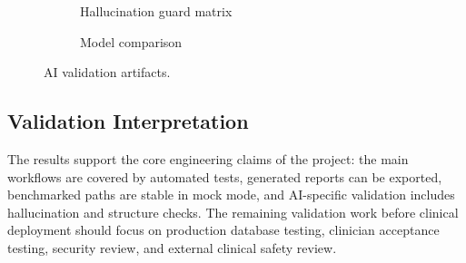 \begin{figure}[h]
\centering
\begin{subfigure}{0.48\textwidth}
  \centering
  \caption{Hallucination guard matrix}
\end{subfigure}\hfill
\begin{subfigure}{0.48\textwidth}
  \centering
  \caption{Model comparison}
\end{subfigure}
\caption{AI validation artifacts.}
\end{figure}

\subsection{Validation Interpretation}

The results support the core engineering claims of the project: the main workflows are covered by automated tests, generated reports can be exported, benchmarked paths are stable in mock mode, and AI-specific validation includes hallucination and structure checks. The remaining validation work before clinical deployment should focus on production database testing, clinician acceptance testing, security review, and external clinical safety review.
